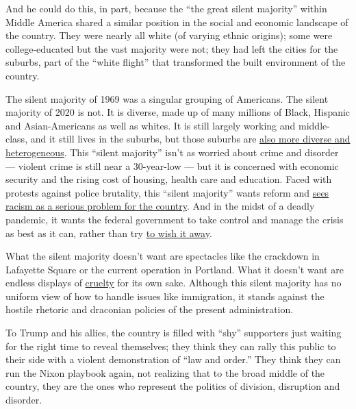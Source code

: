 And he could do this, in part, because the ``the great silent majority''
within Middle America shared a similar position in the social and
economic landscape of the country. They were nearly all white (of
varying ethnic origins); some were college-educated but the vast
majority were not; they had left the cities for the suburbs, part of the
``white flight'' that transformed the built environment of the country.

The silent majority of 1969 was a singular grouping of Americans. The
silent majority of 2020 is not. It is diverse, made up of many millions
of Black, Hispanic and Asian-Americans as well as whites. It is still
largely working and middle-class, and it still lives in the suburbs, but
those suburbs are
\href{https://www.pewsocialtrends.org/2018/05/22/demographic-and-economic-trends-in-urban-suburban-and-rural-communities/}{also
more diverse and heterogeneous}. This ``silent majority'' isn't as
worried about crime and disorder --- violent crime is still near a
30-year-low --- but it is concerned with economic security and the
rising cost of housing, health care and education. Faced with protests
against police brutality, this ``silent majority'' wants reform and
\href{https://t.co/usUGEAif8U}{sees racism as a serious problem for the
country}. And in the midst of a deadly pandemic, it wants the federal
government to take control and manage the crisis as best as it can,
rather than try
\href{https://www.washingtonpost.com/politics/2020/07/01/with-new-coronavirus-cases-hitting-new-high-trump-revisits-his-fantasy-virus-will-just-go-away/}{to
wish it away}.

What the silent majority doesn't want are spectacles like the crackdown
in Lafayette Square or the current operation in Portland. What it
doesn't want are endless displays of
\href{https://www.theatlantic.com/ideas/archive/2018/10/the-cruelty-is-the-point/572104/}{cruelty}
for its own sake. Although this silent majority has no uniform view of
how to handle issues like immigration, it stands against the hostile
rhetoric and draconian policies of the present administration.

To Trump and his allies, the country is filled with ``shy'' supporters
just waiting for the right time to reveal themselves; they think they
can rally this public to their side with a violent demonstration of
``law and order.'' They think they can run the Nixon playbook again, not
realizing that to the broad middle of the country, they are the ones who
represent the politics of division, disruption and disorder.

